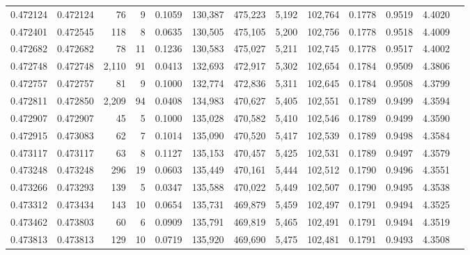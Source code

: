 \begin{tabular}{rrrrrrrrrrrrr}
0.472124 & 0.472124 &    76 &     9 &                                     0.1059 & 130,387 & 475,223 &   5,192 & 102,764 & 0.1778 & 0.9519 & 4.4020 \\
0.472401 & 0.472545 &   118 &     8 &                                     0.0635 & 130,505 & 475,105 &   5,200 & 102,756 & 0.1778 & 0.9518 & 4.4009 \\
0.472682 & 0.472682 &    78 &    11 &                                     0.1236 & 130,583 & 475,027 &   5,211 & 102,745 & 0.1778 & 0.9517 & 4.4002 \\
0.472748 & 0.472748 & 2,110 &    91 &                                     0.0413 & 132,693 & 472,917 &   5,302 & 102,654 & 0.1784 & 0.9509 & 4.3806 \\
0.472757 & 0.472757 &    81 &     9 &                                     0.1000 & 132,774 & 472,836 &   5,311 & 102,645 & 0.1784 & 0.9508 & 4.3799 \\
0.472811 & 0.472850 & 2,209 &    94 &                                     0.0408 & 134,983 & 470,627 &   5,405 & 102,551 & 0.1789 & 0.9499 & 4.3594 \\
0.472907 & 0.472907 &    45 &     5 &                                     0.1000 & 135,028 & 470,582 &   5,410 & 102,546 & 0.1789 & 0.9499 & 4.3590 \\
0.472915 & 0.473083 &    62 &     7 &                                     0.1014 & 135,090 & 470,520 &   5,417 & 102,539 & 0.1789 & 0.9498 & 4.3584 \\
0.473117 & 0.473117 &    63 &     8 &                                     0.1127 & 135,153 & 470,457 &   5,425 & 102,531 & 0.1789 & 0.9497 & 4.3579 \\
0.473248 & 0.473248 &   296 &    19 &                                     0.0603 & 135,449 & 470,161 &   5,444 & 102,512 & 0.1790 & 0.9496 & 4.3551 \\
0.473266 & 0.473293 &   139 &     5 &                                     0.0347 & 135,588 & 470,022 &   5,449 & 102,507 & 0.1790 & 0.9495 & 4.3538 \\
0.473312 & 0.473434 &   143 &    10 &                                     0.0654 & 135,731 & 469,879 &   5,459 & 102,497 & 0.1791 & 0.9494 & 4.3525 \\
0.473462 & 0.473803 &    60 &     6 &                                     0.0909 & 135,791 & 469,819 &   5,465 & 102,491 & 0.1791 & 0.9494 & 4.3519 \\
0.473813 & 0.473813 &   129 &    10 &                                     0.0719 & 135,920 & 469,690 &   5,475 & 102,481 & 0.1791 & 0.9493 & 4.3508 \\

\end{tabular}
